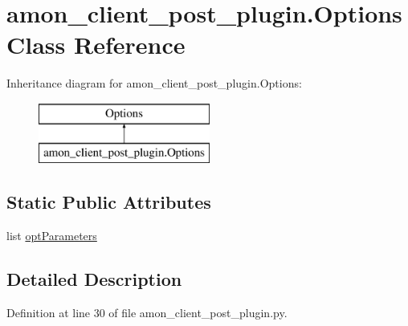 \hypertarget{classamon__client__post__plugin_1_1_options}{\section{amon\-\_\-client\-\_\-post\-\_\-plugin.\-Options Class Reference}
\label{classamon__client__post__plugin_1_1_options}
}
Inheritance diagram for amon\-\_\-client\-\_\-post\-\_\-plugin.\-Options\-:\begin{figure}[H]
\begin{center}
\leavevmode
\includegraphics[height=2.000000cm]{d2/de5/classamon__client__post__plugin_1_1_options}
\end{center}
\end{figure}
\subsection*{Static Public Attributes}
\begin{DoxyCompactItemize}
\item 
list \hyperlink{classamon__client__post__plugin_1_1_options_a3ef4603fe9e534ae26702c562ad5dbb0}{opt\-Parameters}
\end{DoxyCompactItemize}


\subsection{Detailed Description}


Definition at line 30 of file amon\-\_\-client\-\_\-post\-\_\-plugin.\-py.



